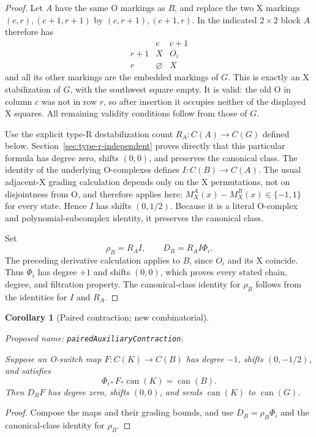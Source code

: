\documentclass[11pt,a4paper]{article}
\newtheorem{corollary}[theorem]{Corollary}
\theoremstyle{remark}
\newcommand{\formalname}[1]{\leavevmode\par\noindent\textnormal{\small Proposed name: \texttt{#1}.}\par\smallskip}
\begin{document}
\begin{proof}
Let $A$ have the same O markings as $B$, and replace the two X markings
$(c,r),(c+1,r+1)$ by
$(c,r+1),(c+1,r)$.  In the indicated $2\times2$ block $A$ therefore has
\[
 \begin{array}{c|cc}
 &c&c+1\\ \hline
 r+1&X&O_i\\
 r&\varnothing&X
 \end{array}
\]
and all its other markings are the embedded markings of $G$.  This is
exactly an X stabilization of $G$, with the southwest square empty.
It is valid: the old O in column $c$ was not in row $r$, so after
insertion it occupies neither of the displayed X squares.  All remaining
validity conditions follow from those of $G$.

Use the explicit type-R destabilization count
$R_A:C(A)\to C(G)$ defined below.  Section~\ref{sec:type-r-independent}
proves directly that this particular formula has degree zero, shifts
$(0,0)$, and preserves the canonical class.  The identity of the
underlying O-complexes defines
$I:C(B)\to C(A)$.  The usual adjacent-X grading calculation depends
only on the X permutations, not on disjointness from O, and therefore
applies here: $M_X^A(x)-M_X^B(x)\in\{-1,1\}$ for every state.  Hence
$I$ has shifts $(0,1/2)$.  Because it is a literal O-complex and
polynomial-subcomplex identity, it preserves the canonical class.

Set
\[
 \rho_B=R_A I,\qquad D_B=R_A I\Phi_i.
\]
The preceding derivative calculation applies to $B$, since $O_i$ and
its X coincide.  Thus $\Phi_i$ has degree $+1$ and shifts $(0,0)$,
which proves every stated chain, degree, and filtration property.
The canonical-class identity for $\rho_B$ follows from the identities
for $I$ and $R_A$.
\end{proof}

\begin{corollary}[Paired contraction; new combinatorial]\label{cor:paired-aux-contraction}
\formalname{pairedAuxiliaryContraction}
Suppose an O-switch map $F:C(K)\to C(B)$ has degree $-1$, shifts
$(0,-1/2)$, and satisfies
\[
 \Phi_{i*}F_*\operatorname{can}(K)=\operatorname{can}(B).
\]
Then $D_BF$ has degree zero, shifts $(0,0)$, and sends
$\operatorname{can}(K)$ to $\operatorname{can}(G)$.
\end{corollary}
\begin{proof}
Compose the maps and their grading bounds, and use
$D_B=\rho_B\Phi_i$ and the canonical-class identity for $\rho_B$.
\end{proof}
\end{document}
